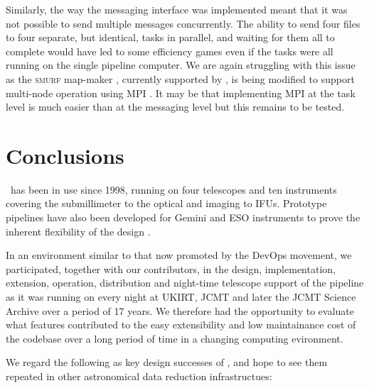 \documentclass[final,authoryear,5p,times,twocolumn]{elsarticle}
\begin{document}
Similarly, the way the messaging interface was implemented meant that
it was not possible to send multiple messages concurrently. The
ability to send four files to four separate, but identical, tasks in
parallel, and waiting for them all to complete would have led to some
efficiency games even if the tasks were all running on the single
pipeline computer. We are again struggling with this issue as
the \textsc{smurf} map-maker \citep[][]{2013MNRAS.430.2545C}, currently supported by
\oracdr, is being modified to support
multi-node operation using MPI \citep{2014ASPC..485..399M}. It may be
that implementing MPI at the task level is much easier than at the
messaging level but this remains to be tested.

\section{Conclusions}

\oracdr\ has been in use since 1998, running on four telescopes and ten
instruments covering the submillimeter to the optical and imaging to
IFUs. Prototype pipelines have also been developed for Gemini and ESO
instruments to prove the inherent flexibility of the design
\citep{2003ASPC..295..237C,2004ASPC..314..460C}.

In an environment similar to that now promoted by the DevOps movement,
we participated, together with our contributors, in the design,
implementation, extension, operation, distribution and night-time
telescope support of the pipeline as it was running on every night at
UKIRT, JCMT and later the JCMT Science Archive over a period of 17
years. We therefore had the opportunity to evaluate what features
contributed to the easy extensibility and low maintainance cost of the
codebase over a long period of time in a changing computing evironment. 

We regard the following as key design successes of \oracdr, and hope
to see them repeated in other astronomical data reduction
infrastructues:
\end{document}

